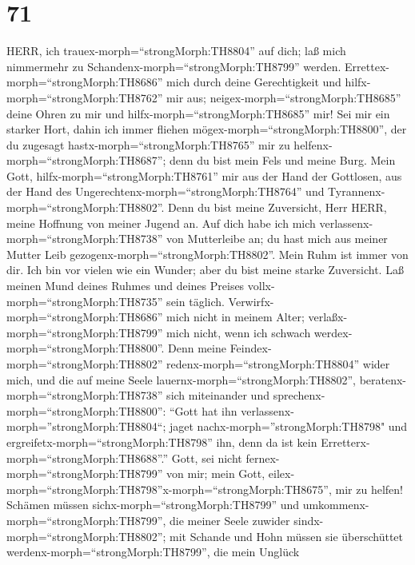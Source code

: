 \hypertarget{section-70}{%
\section{71}\label{section-70}}

 HERR, ich trauex-morph=``strongMorph:TH8804'' auf dich; laß
mich nimmermehr zu Schandenx-morph=``strongMorph:TH8799'' werden.
 Errettex-morph=``strongMorph:TH8686'' mich durch deine
Gerechtigkeit und hilfx-morph=``strongMorph:TH8762'' mir aus;
neigex-morph=``strongMorph:TH8685'' deine Ohren zu mir und
hilfx-morph=``strongMorph:TH8685'' mir!  Sei mir ein starker
Hort, dahin ich immer fliehen mögex-morph=``strongMorph:TH8800'', der du
zugesagt hastx-morph=``strongMorph:TH8765'' mir zu
helfenx-morph=``strongMorph:TH8687''; denn du bist mein Fels und meine
Burg.  Mein Gott, hilfx-morph=``strongMorph:TH8761'' mir aus
der Hand der Gottlosen, aus der Hand des
Ungerechtenx-morph=``strongMorph:TH8764'' und
Tyrannenx-morph=``strongMorph:TH8802''.  Denn du bist meine
Zuversicht, Herr HERR, meine Hoffnung von meiner Jugend an. 
Auf dich habe ich mich verlassenx-morph=``strongMorph:TH8738'' von
Mutterleibe an; du hast mich aus meiner Mutter Leib
gezogenx-morph=``strongMorph:TH8802''. Mein Ruhm ist immer von dir.
 Ich bin vor vielen wie ein Wunder; aber du bist meine
starke Zuversicht.  Laß meinen Mund deines Ruhmes und deines
Preises vollx-morph=``strongMorph:TH8735'' sein täglich. 
Verwirfx-morph=``strongMorph:TH8686'' mich nicht in meinem Alter;
verlaßx-morph=``strongMorph:TH8799'' mich nicht, wenn ich schwach
werdex-morph=``strongMorph:TH8800''.  Denn meine
Feindex-morph=``strongMorph:TH8802'' redenx-morph=``strongMorph:TH8804''
wider mich, und die auf meine Seele
lauernx-morph=``strongMorph:TH8802'',
beratenx-morph=``strongMorph:TH8738'' sich miteinander  und
sprechenx-morph=``strongMorph:TH8800'': ``Gott hat ihn
verlassenx-morph=''strongMorph:TH8804``; jaget
nachx-morph=''strongMorph:TH8798" und
ergreifetx-morph=``strongMorph:TH8798'' ihn, denn da ist kein
Erretterx-morph=``strongMorph:TH8688''.''  Gott, sei nicht
fernex-morph=``strongMorph:TH8799'' von mir; mein Gott,
eilex-morph=``strongMorph:TH8798''\textbar x-morph=``strongMorph:TH8675'',
mir zu helfen!  Schämen müssen
sichx-morph=``strongMorph:TH8799'' und
umkommenx-morph=``strongMorph:TH8799'', die meiner Seele zuwider
sindx-morph=``strongMorph:TH8802''; mit Schande und Hohn müssen sie
überschüttet werdenx-morph=``strongMorph:TH8799'', die mein Unglück
